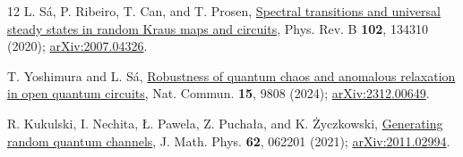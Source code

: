 \documentclass[aps,prb,twocolumn,nofootinbib,superscriptaddress]{revtex4-2}
\begin{document}
\begin{thebibliography}{12}
 L. S\'a, P. Ribeiro, T. Can, and T. Prosen,
\href{https://doi.org/10.1103/PhysRevB.102.134310}{Spectral transitions and
universal steady states in random Kraus maps and circuits},
Phys. Rev. B \textbf{102}, 134310 (2020);
\href{https://arxiv.org/abs/2007.04326}{arXiv:2007.04326}.

 T. Yoshimura and L. S\'a,
\href{https://www.nature.com/articles/s41467-024-54164-7}{Robustness of
quantum chaos and anomalous relaxation in open quantum circuits},
Nat. Commun. \textbf{15}, 9808 (2024);
\href{https://arxiv.org/abs/2312.00649}{arXiv:2312.00649}.

 R. Kukulski, I. Nechita, \L{}. Pawela, Z. Pucha\l{}a,
and K. \.{Z}yczkowski,
\href{https://doi.org/10.1063/5.0038838}{Generating random quantum channels},
J. Math. Phys. \textbf{62}, 062201 (2021);
\href{https://arxiv.org/abs/2011.02994}{arXiv:2011.02994}.
\end{thebibliography}
\end{document}

